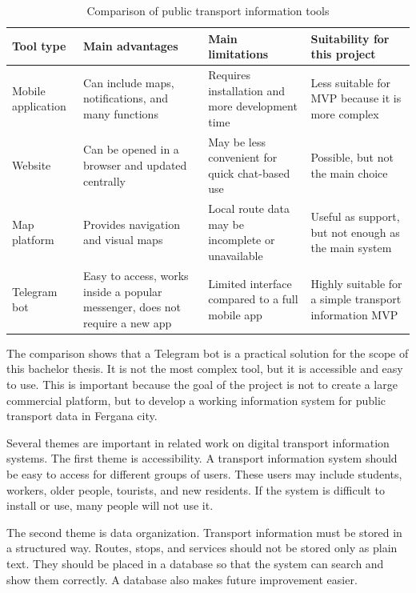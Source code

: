 \begin{table}[H]
\centering
\caption{Comparison of public transport information tools}
\label{tab:transport_tools_comparison}
\begin{tabular}{|p{3.2cm}|p{4cm}|p{3.5cm}|p{3.5cm}|}
\hline
\textbf{Tool type} & \textbf{Main advantages} & \textbf{Main limitations} & \textbf{Suitability for this project} \\
\hline
Mobile application & Can include maps, notifications, and many functions & Requires installation and more development time & Less suitable for MVP because it is more complex \\
\hline
Website & Can be opened in a browser and updated centrally & May be less convenient for quick chat-based use & Possible, but not the main choice \\
\hline
Map platform & Provides navigation and visual maps & Local route data may be incomplete or unavailable & Useful as support, but not enough as the main system \\
\hline
Telegram bot & Easy to access, works inside a popular messenger, does not require a new app & Limited interface compared to a full mobile app & Highly suitable for a simple transport information MVP \\
\hline
\end{tabular}
\end{table}

The comparison shows that a Telegram bot is a practical solution for the scope of this bachelor thesis. It is not the most complex tool, but it is accessible and easy to use. This is important because the goal of the project is not to create a large commercial platform, but to develop a working information system for public transport data in Fergana city.

Several themes are important in related work on digital transport information systems. The first theme is accessibility. A transport information system should be easy to access for different groups of users. These users may include students, workers, older people, tourists, and new residents. If the system is difficult to install or use, many people will not use it.

The second theme is data organization. Transport information must be stored in a structured way. Routes, stops, and services should not be stored only as plain text. They should be placed in a database so that the system can search and show them correctly. A database also makes future improvement easier.

